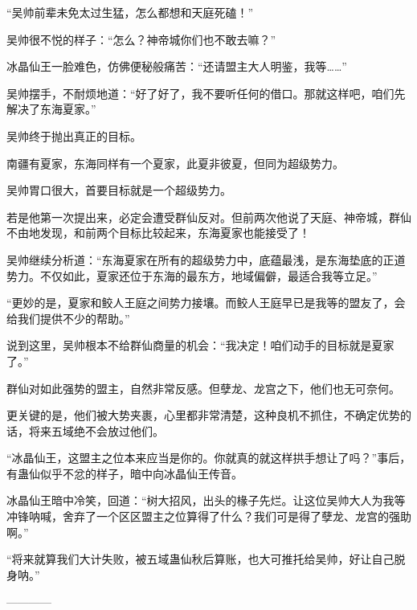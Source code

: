 \begin{this_body}
“吴帅前辈未免太过生猛，怎么都想和天庭死磕！”

吴帅很不悦的样子：“怎么？神帝城你们也不敢去嘛？”

冰晶仙王一脸难色，仿佛便秘般痛苦：“还请盟主大人明鉴，我等……”

吴帅摆手，不耐烦地道：“好了好了，我不要听任何的借口。那就这样吧，咱们先解决了东海夏家。”

吴帅终于抛出真正的目标。

南疆有夏家，东海同样有一个夏家，此夏非彼夏，但同为超级势力。

吴帅胃口很大，首要目标就是一个超级势力。

若是他第一次提出来，必定会遭受群仙反对。但前两次他说了天庭、神帝城，群仙不由地发现，和前两个目标比较起来，东海夏家也能接受了！

吴帅继续分析道：“东海夏家在所有的超级势力中，底蕴最浅，是东海垫底的正道势力。不仅如此，夏家还位于东海的最东方，地域偏僻，最适合我等立足。”

“更妙的是，夏家和鲛人王庭之间势力接壤。而鲛人王庭早已是我等的盟友了，会给我们提供不少的帮助。”

说到这里，吴帅根本不给群仙商量的机会：“我决定！咱们动手的目标就是夏家了。”

群仙对如此强势的盟主，自然非常反感。但孽龙、龙宫之下，他们也无可奈何。

更关键的是，他们被大势夹裹，心里都非常清楚，这种良机不抓住，不确定优势的话，将来五域绝不会放过他们。

“冰晶仙王，这盟主之位本来应当是你的。你就真的就这样拱手想让了吗？”事后，有蛊仙似乎不忿的样子，暗中向冰晶仙王传音。

冰晶仙王暗中冷笑，回道：“树大招风，出头的椽子先烂。让这位吴帅大人为我等冲锋呐喊，舍弃了一个区区盟主之位算得了什么？我们可是得了孽龙、龙宫的强助啊。”

“将来就算我们大计失败，被五域蛊仙秋后算账，也大可推托给吴帅，好让自己脱身呐。”

------------

\end{this_body}


